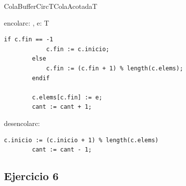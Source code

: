 \begin{module}{ColaBufferCirc}{T}{ColaAcotada}{T}



	\begin{proc}{encolar}{\Inout c: \moduletype, \In e: T}{}
		\begin{lstlisting}[numbers=none,frame=none]
		if c.fin == -1
			c.fin := c.inicio;
		else
			c.fin := (c.fin + 1) % length(c.elems);
		endif

		c.elems[c.fin] := e;
		cant := cant + 1;
		\end{lstlisting}
	\end{proc}

	\begin{proc}{desencolar}{\Inout c: \moduletype}{}
		\begin{lstlisting}[numbers=none,frame=none]
		c.inicio := (c.inicio + 1) % length(c.elems)
		cant := cant - 1;
		\end{lstlisting}
	\end{proc}

\end{module}

\subsection{Ejercicio 6}
\hacer


